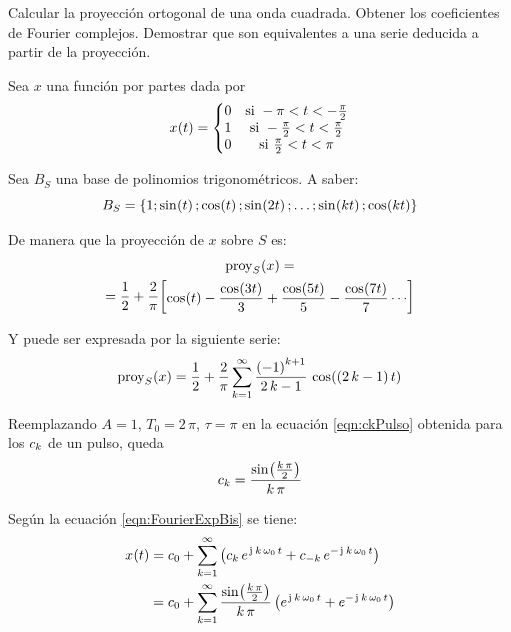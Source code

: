 \begin{mdframed}[style=ExampleFrame]
    \begin{example}
    \end{example}
    \begin{formatI}
        Calcular la proyección ortogonal de una onda cuadrada.
        Obtener los coeficientes de Fourier complejos.
        Demostrar que son equivalentes a una serie deducida a partir de la proyección.
    \end{formatI}
    \vspace{1em}
    Sea $x$ una función por partes dada por
    \[
        \fx[x]{t} =
        \left\{
        \begin{matrix}
            0 & \text{si } -\pi < t < -\frac{\pi}{2}
            \\
            1 & \text{si } -\frac{\pi}{2} < t < \frac{\pi}{2}
            \\
            0 & \text{si } \frac{\pi}{2} < t < \pi
        \end{matrix}
        \right.
    \]
    
    Sea $B_S$ una base de polinomios trigonométricos.
    A saber:
    \[
        B_S = \inBraces{1; \fx[\sin]{t}; \fx[\cos]{t}; \fx[\sin]{2t}; \dots; \fx[\sin]{\kth t}; \fx[\cos]{\kth t}}
    \]
    
    De manera que la proyección de $x$ sobre $S$ es:
    \begin{multline*}
        \fx[\proy_S]{x} =
        \\
        = \frac{1}{2} + \frac{2}{\pi} \inBrackets{\fx[\cos]{t} - \dfrac{\fx[\cos]{3t}}{3} + \dfrac{\fx[\cos]{5t}}{5} - \dfrac{\fx[\cos]{7t}}{7} \cdots}
    \end{multline*}

    Y puede ser expresada por la siguiente serie:
    \begin{equation}
        \fx[\proy_S]{x} = \frac{1}{2} + \frac{2}{\pi} \sum_{\kth=1}^\infty \frac{\inParentheses{-1}^{\kth+1}}{2 \, \kth - 1} \, \fx[\cos]{\inParentheses{2 \, \kth -1} t}
        \label{eqn:FourierProy}
    \end{equation}

    Reemplazando $A=1$, $T_0=2\,\pi$, $\tau=\pi$ en la ecuación \ref{eqn:ckPulso} obtenida para los $c_\kth$ de un pulso, queda
    \[
        c_\kth = \frac{ \fx[\sin]{\frac{\kth \, \pi}{2}} }{\kth \, \pi}
    \]

    Según la ecuación \ref{eqn:FourierExpBis} se tiene:
    \begin{align*}
        \fx[x]{t} &= c_0 + \sum_{\kth=1}^{\infty} \inParentheses{ c_\kth \, e^{\iu \, \kth \, \omega_0 \, t} + c_{-\kth} \, e^{-\iu \, \kth \, \omega_0 \, t} }
        \\
        &= c_0 + \sum_{\kth=1}^{\infty} \frac{\fx[\sin]{\frac{\kth \, \pi}{2}}}{\kth \, \pi} \inParentheses{ e^{\iu \, \kth \, \omega_0 \, t} + e^{-\iu \, \kth \, \omega_0 \, t} }
    \end{align*}


\end{mdframed}
